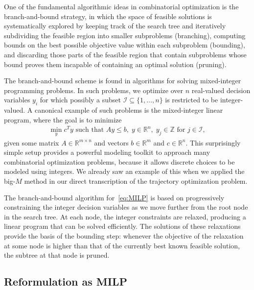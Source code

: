 \documentclass[a4paper]{report}
\theoremstyle{definition}
\theoremstyle{plain}
\begin{document}

One of the fundamental algorithmic ideas in combinatorial optimization is the
branch-and-bound strategy, in which the space of feasible solutions is
systematically explored by keeping track of the search tree and iteratively
subdividing the feasible region into smaller subproblems (branching), computing
bounds on the best possible objective value within each subproblem (bounding),
and discarding those parts of the feasible region that contain subproblems whose
bound proves them incapable of containing an optimal solution (pruning).

The branch-and-bound scheme is found in algorithms for solving mixed-integer
programming problems.
%
In such problems, we optimize over $n$ real-valued decision variables $y_{i}$
for which possibly a subset $\mathcal{I} \subseteq \{1, \dots, n\}$ is
restricted to be integer-valued.
%
A canonical example of such problems is the mixed-integer linear program, where
the goal is to minimize
\begin{align}\label{eq:MILP}\tag{MILP}
  \min_{y} c^{T} y \text{ such that } Ay \leq b, \; y \in \mathbb{R}^{n}, \; y_{j} \in \mathbb{Z} \text{ for } j \in \mathcal{I},
\end{align}
given some matrix $A \in \mathbb{R}^{m\times n}$ and vectors
$b \in \mathbb{R}^{m}$ and $c \in \mathbb{R}^{n}$.
%
This surprisingly simple setup provides a powerful modeling toolkit to approach
many combinatorial optimization problems, because it allows discrete choices to
be modeled using integers.
%
We already saw an example of this when we applied the big-$M$ method in our
direct transcription of the trajectory optimization problem.

The branch-and-bound algorithm for~\eqref{eq:MILP} is based on progressively
constraining the integer decision variables as we move further from the root
node in the search tree.
%
At each node, the integer constraints are relaxed, producing a linear program
that can be solved efficiently.
%
The solutions of these relaxations provide the basis of the bounding step:
whenever the objective of the relaxation at some node is higher than that of the
currently best known feasible solution, the subtree at that node is pruned.

\subsection{Reformulation as MILP}
\end{document}
